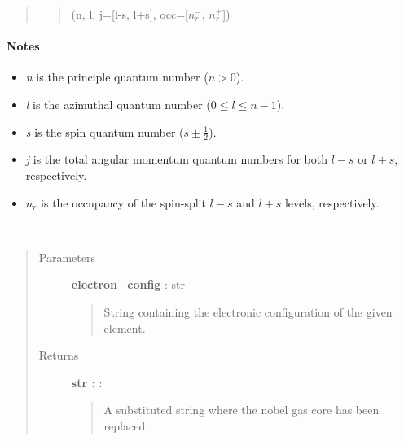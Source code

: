 \documentclass[letterpaper,10pt,english]{sphinxmanual}
\begin{document}
\begin{fulllineitems}
\begin{fulllineitems}
\begin{quote}
\begin{description}
\begin{quote}
(n, l, j={[}l-s, l+s{]}, occ={[}\(n^-_r\), \(n^+_r\){]})
\end{quote}

\end{description}\end{quote}
\paragraph{Notes}
\begin{itemize}
\item {} 
\emph{n} is the principle quantum number (\(n > 0\)).

\item {} 
\emph{l} is the azimuthal quantum number (\(0 \leq l \leq n-1\)).

\item {} 
\emph{s} is the spin quantum number (\(s \pm \frac{1}{2}\)).

\item {} 
\emph{j} is the total angular momentum quantum numbers for both 
\(l-s\) or \(l+s\), respectively.

\item {} 
\(n_r\) is the occupancy of the spin-split \(l-s\) 
and \(l+s\) levels, respectively.

\end{itemize}

\end{fulllineitems}


\begin{fulllineitems}
\label{modules:phaseshifts.atorb.Atorb.replace_core_config}~\begin{quote}\begin{description}
\item[{Parameters}] \leavevmode
\textbf{electron\_config} : str
\begin{quote}

String containing the electronic configuration of the given 
element.
\end{quote}

\item[{Returns}] \leavevmode
\textbf{str :} :
\begin{quote}

A substituted string where the nobel gas core has been replaced.
\end{quote}


\end{description}
\end{quote}
\end{fulllineitems}
\end{fulllineitems}
\end{document}
